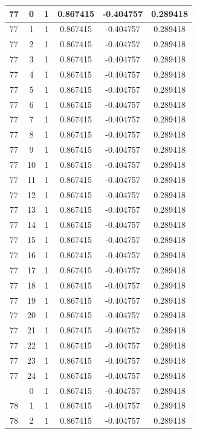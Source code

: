\documentclass[12pt,a4paper]{article}
\numberwithin{equation}{section}
\numberwithin{figure}{section}
\numberwithin{table}{section}
\begin{document}
\begin{longtable}{|c|c|c|c|c|c|}
77 & 0 & 1 & 0.867415 & -0.404757 & 0.289418 \\ \hline
77 & 1 & 1 & 0.867415 & -0.404757 & 0.289418 \\ \hline
77 & 2 & 1 & 0.867415 & -0.404757 & 0.289418 \\ \hline
77 & 3 & 1 & 0.867415 & -0.404757 & 0.289418 \\ \hline
77 & 4 & 1 & 0.867415 & -0.404757 & 0.289418 \\ \hline
77 & 5 & 1 & 0.867415 & -0.404757 & 0.289418 \\ \hline
77 & 6 & 1 & 0.867415 & -0.404757 & 0.289418 \\ \hline
77 & 7 & 1 & 0.867415 & -0.404757 & 0.289418 \\ \hline
77 & 8 & 1 & 0.867415 & -0.404757 & 0.289418 \\ \hline
77 & 9 & 1 & 0.867415 & -0.404757 & 0.289418 \\ \hline
77 & 10 & 1 & 0.867415 & -0.404757 & 0.289418 \\ \hline
77 & 11 & 1 & 0.867415 & -0.404757 & 0.289418 \\ \hline
77 & 12 & 1 & 0.867415 & -0.404757 & 0.289418 \\ \hline
77 & 13 & 1 & 0.867415 & -0.404757 & 0.289418 \\ \hline
77 & 14 & 1 & 0.867415 & -0.404757 & 0.289418 \\ \hline
77 & 15 & 1 & 0.867415 & -0.404757 & 0.289418 \\ \hline
77 & 16 & 1 & 0.867415 & -0.404757 & 0.289418 \\ \hline
77 & 17 & 1 & 0.867415 & -0.404757 & 0.289418 \\ \hline
77 & 18 & 1 & 0.867415 & -0.404757 & 0.289418 \\ \hline
77 & 19 & 1 & 0.867415 & -0.404757 & 0.289418 \\ \hline
77 & 20 & 1 & 0.867415 & -0.404757 & 0.289418 \\ \hline
77 & 21 & 1 & 0.867415 & -0.404757 & 0.289418 \\ \hline
77 & 22 & 1 & 0.867415 & -0.404757 & 0.289418 \\ \hline
77 & 23 & 1 & 0.867415 & -0.404757 & 0.289418 \\ \hline
77 & 24 & 1 & 0.867415 & -0.404757 & 0.289418 \\ \hline
\pagebreak
78 & 0 & 1 & 0.867415 & -0.404757 & 0.289418 \\ \hline
78 & 1 & 1 & 0.867415 & -0.404757 & 0.289418 \\ \hline
78 & 2 & 1 & 0.867415 & -0.404757 & 0.289418 \\ \hline

\end{longtable}
\end{document}

